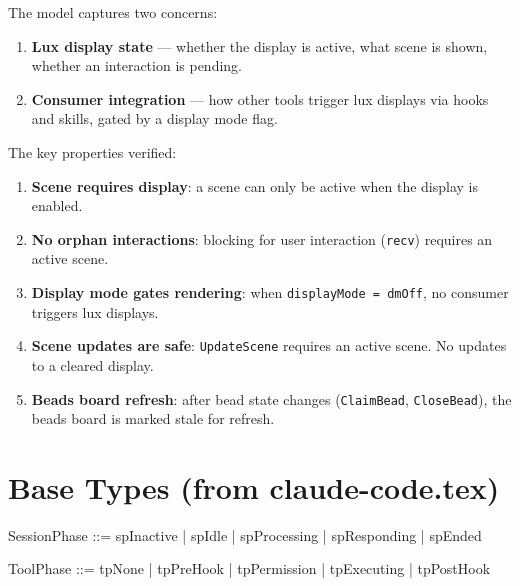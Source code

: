 \documentclass[a4paper,10pt,fleqn]{article}
\begin{document}
The model captures two concerns:

\begin{enumerate}
  \item \textbf{Lux display state} --- whether the display is active,
    what scene is shown, whether an interaction is pending.
  \item \textbf{Consumer integration} --- how other tools trigger
    lux displays via hooks and skills, gated by a display mode flag.
\end{enumerate}

The key properties verified:

\begin{enumerate}
  \item \textbf{Scene requires display}: a scene can only be active
    when the display is enabled.
  \item \textbf{No orphan interactions}: blocking for user interaction
    (\texttt{recv}) requires an active scene.
  \item \textbf{Display mode gates rendering}: when
    \texttt{displayMode = dmOff}, no consumer triggers lux displays.
  \item \textbf{Scene updates are safe}: \texttt{UpdateScene} requires
    an active scene. No updates to a cleared display.
  \item \textbf{Beads board refresh}: after bead state changes
    (\texttt{ClaimBead}, \texttt{CloseBead}), the beads board is
    marked stale for refresh.
\end{enumerate}

\section{Base Types (from claude-code.tex)}

\begin{zed}
\end{zed}

\begin{zed}
  SessionPhase ::= spInactive | spIdle | spProcessing | spResponding | spEnded
\end{zed}

\begin{zed}
  ToolPhase ::= tpNone | tpPreHook | tpPermission | tpExecuting | tpPostHook
\end{zed}
\end{document}
